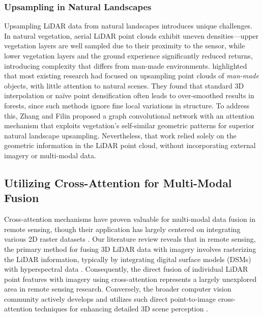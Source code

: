 \documentclass[preprint,12pt,authoryear]{elsarticle}
\begin{document}
\subsubsection{Upsampling in Natural Landscapes}

Upsampling LiDAR data from natural landscapes introduces unique challenges. In natural vegetation, aerial LiDAR point clouds exhibit uneven densities—upper vegetation layers are well sampled due to their proximity to the sensor, while lower vegetation layers and the ground experience significantly reduced returns, introducing complexity that differs from man-made environments. \citet{zhang2022deep} highlighted that most existing research had focused on upsampling point clouds of \emph{man-made} objects, with little attention to natural scenes. They found that standard 3D interpolation or naïve point densification often leads to over-smoothed results in forests, since such methods ignore fine local variations in structure. To address this, Zhang and Filin proposed  a graph convolutional network with an attention mechanism that exploits vegetation's self-similar geometric patterns for superior natural landscape upsampling. Nevertheless, that work relied solely on the geometric information in the LiDAR point cloud, without incorporating external imagery or multi-modal data.

\subsection{Utilizing Cross-Attention for Multi-Modal Fusion}

Cross-attention mechanisms have proven valuable for multi-modal data fusion in remote sensing, though their application has largely centered on integrating various 2D raster datasets \citep{yan2025remote, ma2022crossmodal, qingyun2022cross, li2024cross}. Our literature review reveals that in remote sensing, the primary method for fusing 3D LiDAR data with imagery involves rasterizing the LiDAR information, typically by integrating digital surface models (DSMs) with hyperspectral data \citep{yu2024dmsca, li2024multi, yang2024lidar}. Consequently, the direct fusion of individual LiDAR point features with imagery using cross-attention represents a largely unexplored area in remote sensing research. Conversely, the broader computer vision community actively develops and utilizes such direct point-to-image cross-attention techniques for enhancing detailed 3D scene perception \citep{zhu2024cams, yoo20203d, wu2021point}.
\end{document}
